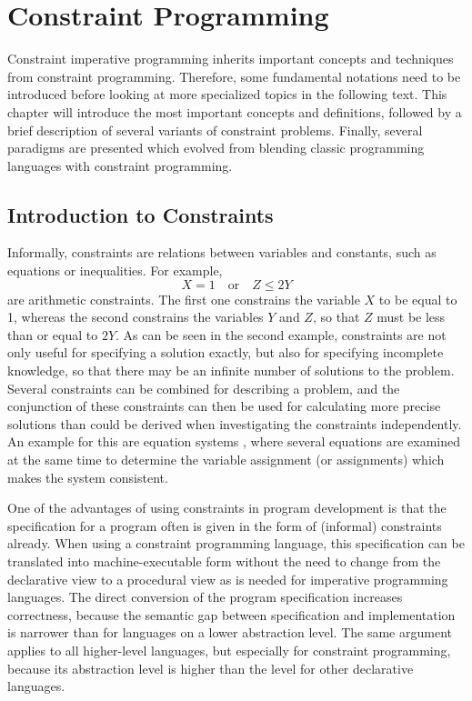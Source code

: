 
\chapter{Constraint Programming}
\label{cha:constraint-programming}

Constraint imperative programming inherits important concepts and
techniques from constraint programming.  Therefore, some fundamental
notations need to be introduced before looking at more specialized
topics in the following text.  This chapter will introduce the most
important concepts and definitions, followed by a brief description of
several variants of constraint problems.  Finally, several paradigms
are presented which evolved from blending classic programming
languages with constraint programming.


\section{Introduction to Constraints}
\label{sec:introduction-to-constraints}

Informally, constraints are relations between variables and constants,
such as equations or inequalities.  For example,
$$X=1\quad\text{or}\quad Z\leq 2Y$$
are arithmetic constraints.  The
first one constrains the variable $X$ to be equal to 1, whereas the
second constrains the variables $Y$ and $Z$, so that $Z$ must be less
than or equal to $2Y$.  As can be seen in the second example,
constraints are not only useful for specifying a solution exactly, but
also for specifying incomplete knowledge, so that there may be an
infinite number of solutions to the problem.  Several constraints can
be combined for describing a problem, and the conjunction of these
constraints can then be used for calculating more precise solutions
than could be derived when investigating the constraints
independently.  An example for this are equation systems%
, where several equations are examined at the
same time to determine the variable assignment (or assignments) which
makes the system consistent.

One of the advantages of using constraints in program development is
that the specification for a program often is given in the form of
(informal) constraints already.  When using a constraint programming
language, this specification can be translated into machine-executable
form without the need to change from the declarative view to a
procedural view as is needed for imperative programming languages.
The direct conversion of the program specification increases
correctness, because the semantic gap between specification and
implementation is narrower than for languages on a lower abstraction
level.  The same argument applies to all higher-level languages, but
especially for constraint programming, because its abstraction level
is higher than the level for other declarative languages.

